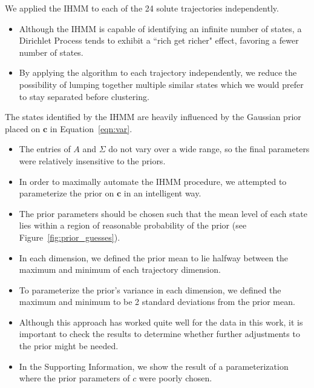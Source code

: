 \documentclass{article}
\begin{document}
  \noindent We applied the IHMM to each of the 24 solute trajectories independently.
  \begin{itemize}
    \item Although the IHMM is capable of identifying an infinite number of states, 
    a Dirichlet Process tends to exhibit a ``rich get richer" effect, favoring
    a fewer number of states.
    \item By applying the algorithm to each trajectory independently, we reduce
    the possibility of lumping together multiple similar states which we
    would prefer to stay separated before clustering.
  \end{itemize}
  
  \noindent The states identified by the IHMM are heavily influenced by the Gaussian prior
  placed on $\mathbf{c}$ in Equation~\ref{eqn:var}.
  \begin{itemize}
    \item The entries of $A$ and $\Sigma$ do not vary over a wide range, so
    the final parameters were relatively insensitive to the priors.
    \item In order to maximally automate the IHMM procedure, we attempted to
    parameterize the prior on $\mathbf{c}$ in an intelligent way.
    \item The prior parameters should be chosen such that the mean level of 
    each state lies within a region of reasonable probability of the prior (see
    Figure~\ref{fig:prior_guesses}).
    \item In each dimension, we defined the prior mean to lie halfway between the 
    maximum and minimum of each trajectory dimension. 
    \item To parameterize the prior's variance in each dimension, we defined the
    maximum and minimum to be 2 standard deviations from the prior mean.
    \item Although this approach has worked quite well for the data in this work,
    it is important to check the results to determine whether further adjustments
    to the prior might be needed.
    \item In the Supporting Information, we show the result of a parameterization
    where the prior parameters of $c$ were poorly chosen. %
  \end{itemize}
  
\end{document}
